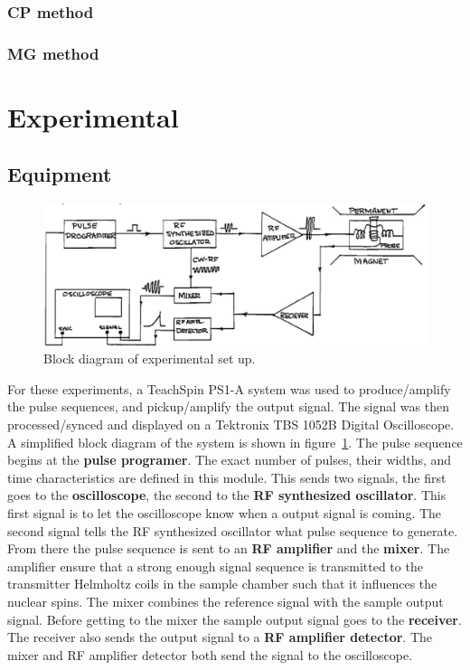 \documentclass[
reprint,
amsmath,amssymb,
aps,
tikz,
border=5pt
]{revtex4-1}
\begin{document}
\subsubsection*{CP method}

\subsubsection*{MG method}


\section*{Experimental }

\subsection*{Equipment}

    \begin{figure}[h]
      \includegraphics[width=0.4 \textwidth]{figures/block_diagram.png}
      \caption{Block diagram of experimental set up.}
      \label{fig:block}
    \end{figure}


    For these experiments, a TeachSpin PS1-A system was used to produce/amplify the pulse sequences, and pickup/amplify the output signal. The signal was then processed/synced and displayed on a Tektronix TBS 1052B Digital Oscilloscope. A simplified block diagram of the system is shown in figure~\ref{fig:block}. The pulse sequence begins at the \textbf{pulse programer}. The exact number of pulses, their widths, and time characteristics are defined in this module. This sends two signals, the first goes to the \textbf{oscilloscope}, the second to the \textbf{RF synthesized oscillator}. This first signal is to let the oscilloscope know when a output signal is coming. The second signal tells the RF synthesized oscillator what pulse sequence to generate. From there the pulse sequence is sent to an \textbf{RF amplifier} and the \textbf{mixer}. The amplifier ensure that a strong enough signal sequence is transmitted to the transmitter Helmholtz coils in the sample chamber such that it influences the nuclear spins. The mixer combines the reference signal with the sample output signal. Before getting to the mixer the sample output signal goes to the \textbf{receiver}. The receiver also sends the output signal to a \textbf{RF amplifier detector}. The mixer and RF amplifier detector both send the signal to the oscilloscope. 
    
\end{document}
